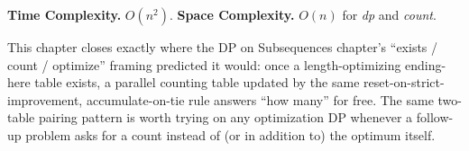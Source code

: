 \begin{complexitybox}
\textbf{Time Complexity.} $O(n^2)$.
\textbf{Space Complexity.} $O(n)$ for \textit{dp} and \textit{count}.
\end{complexitybox}

\begin{takeawaybox}
This chapter closes exactly where the DP on Subsequences chapter's
``exists / count / optimize'' framing predicted it would: once a
length-optimizing ending-here table exists, a parallel counting table
updated by the same reset-on-strict-improvement,
accumulate-on-tie rule answers ``how many'' for free. The same two-table
pairing pattern is worth trying on any optimization DP whenever a
follow-up problem asks for a count instead of (or in addition to) the
optimum itself.
\end{takeawaybox}
